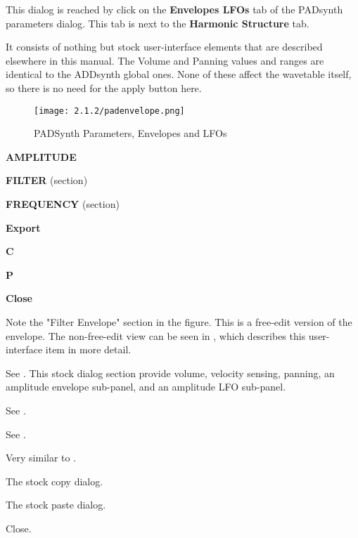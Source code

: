    This dialog is reached by click on the \textbf{Envelopes LFOs}
   tab of the PADsynth parameters dialog.  This tab is next to the
   \textbf{Harmonic Structure} tab.

   It consists of nothing but stock user-interface elements that are described
   elsewhere in this manual.
   The Volume and Panning values and ranges are identical to the ADDsynth
   global ones.
   None of these affect the wavetable itself, so there is no need for the apply
   button here.

\begin{figure}[H]
   \centering
   \texttt{[image: 2.1.2/padenvelope.png]}
   \caption{PADSynth Parameters, Envelopes and LFOs}
   \label{fig:padsynth_parameters_envelopes_and_lfos}
\end{figure}

   \begin{enumber}
      \item \textbf{AMPLITUDE}
      \item \textbf{FILTER} (section)
      \item \textbf{FREQUENCY} (section)
      \item \textbf{Export}
      \item \textbf{C}
      \item \textbf{P}
      \item \textbf{Close}
   \end{enumber}

   Note the "Filter Envelope" section in the figure.  This is a free-edit
   version of the envelope.  The non-free-edit view can be seen in
   , which describes this user-interface item in more
   detail.

   See .
   This stock dialog section provide volume, velocity sensing, panning, an
   amplitude envelope sub-panel, and an amplitude LFO sub-panel.

   See .

   See .

   Very similar to
   .

   The stock copy dialog.

   The stock paste dialog.

   Close.

